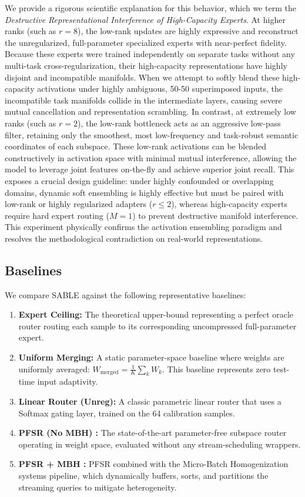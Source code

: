 We provide a rigorous scientific explanation for this behavior, which we term the \emph{Destructive Representational Interference of High-Capacity Experts}. At higher ranks (such as $r=8$), the low-rank updates are highly expressive and reconstruct the unregularized, full-parameter specialized experts with near-perfect fidelity. Because these experts were trained independently on separate tasks without any multi-task cross-regularization, their high-capacity representations have highly disjoint and incompatible manifolds. When we attempt to softly blend these high-capacity activations under highly ambiguous, 50-50 superimposed inputs, the incompatible task manifolds collide in the intermediate layers, causing severe mutual cancellation and representation scrambling. In contrast, at extremely low ranks (such as $r=2$), the low-rank bottleneck acts as an aggressive low-pass filter, retaining only the smoothest, most low-frequency and task-robust semantic coordinates of each subspace. These low-rank activations can be blended constructively in activation space with minimal mutual interference, allowing the model to leverage joint features on-the-fly and achieve superior joint recall. This exposes a crucial design guideline: under highly confounded or overlapping domains, dynamic soft ensembling is highly effective but must be paired with low-rank or highly regularized adapters ($r \le 2$), whereas high-capacity experts require hard expert routing ($M=1$) to prevent destructive manifold interference. This experiment physically confirms the activation ensembling paradigm and resolves the methodological contradiction on real-world representations.

\subsection{Baselines}
We compare SABLE against the following representative baselines:
\begin{enumerate}
    \item \textbf{Expert Ceiling:} The theoretical upper-bound representing a perfect oracle router routing each sample to its corresponding uncompressed full-parameter expert.
    \item \textbf{Uniform Merging:} A static parameter-space baseline where weights are uniformly averaged: $W_{\text{merged}} = \frac{1}{K}\sum_k W_k$. This baseline represents zero test-time input adaptivity.
    \item \textbf{Linear Router (Unreg):} A classic parametric linear router that uses a Softmax gating layer, trained on the 64 calibration samples.
    \item \textbf{PFSR (No MBH) \cite{pfsr}:} The state-of-the-art parameter-free subspace router operating in weight space, evaluated without any stream-scheduling wrappers.
    \item \textbf{PFSR + MBH \cite{mbh}:} PFSR combined with the Micro-Batch Homogenization systems pipeline, which dynamically buffers, sorts, and partitions the streaming queries to mitigate heterogeneity.
\end{enumerate}

